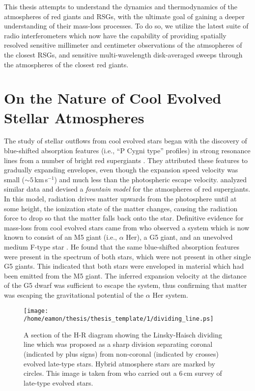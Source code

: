 This thesis attempts to understand the dynamics and thermodynamics of the atmospheres of red giants and RSGs, with the ultimate goal of gaining a deeper understanding of their mass-loss processes. To do so, we utilize the latest suite of radio interferometers which now have the capability of providing spatially resolved sensitive millimeter and centimeter observations of the atmsopheres of the closest RSGs, and sensitive multi-wavelength disk-averaged sweeps through the atmospheres of the closest red giants.

\section{On the Nature of Cool Evolved Stellar Atmospheres}\label{sec:1.2}
The study of stellar outflows from cool evolved stars began with the discovery of blue-shifted absorption features (i.e., ``P Cygni type'' profiles) in strong resonance lines from a number of bright red supergiants \citep{adams_1935}. They attributed these features to gradually expanding envelopes, even though the expansion speed velocity was small ($\sim 5$\,km\,s$^{-1}$) and much less than the photospheric escape velocity. \cite{spitzer_1939} analyzed similar data and devised a \textit{fountain model} for the atmospheres of red supergiants. In this model, radiation drives matter upwards from the photosphere until at some height, the ionization state of the matter changes, causing the radiation force to drop so that the matter falls back onto the star. Definitive evidence for mass-loss from cool evolved stars came from \cite{deutsch_1956} who observed a system which is now known to consist of an M5 giant (i.e., $\alpha$ Her), a G5 giant, and an unevolved medium F-type star \citep{reimers_1977}. He found that the same blue-shifted absorption features were present in the spectrum of both stars, which were not present in other single G5 giants. This indicated that both stars were enveloped in material which had been emitted from the M5 giant. The inferred expansion velocity at the distance of the G5 dwarf was sufficient to escape the system, thus confirming that matter was escaping the gravitational potential of the $\alpha$ Her system.

\begin{figure}[hbt!]
\centering 
          \texttt{[image: /home/eamon/thesis/thesis\_template/1/dividing\_line.ps]}
\caption[The Linsky-Haisch dividing line]{A section of the H-R diagram showing the Linsky-Haisch dividing line which was proposed as a sharp division separating coronal (indicated by plus signs) from non-coronal (indicated by crosses) evolved late-type stars. Hybrid atmosphere stars are marked by circles. This image is taken from \cite{drake_1986} who carried out a 6\,cm survey of late-type evolved stars.}
\label{fig:1.2.1}
\end{figure}

